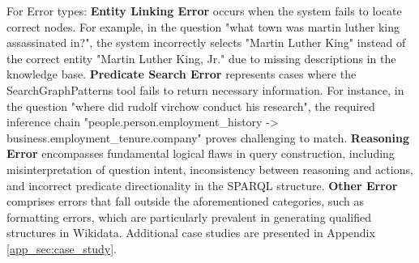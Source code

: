 For Error types:
\textbf{Entity Linking Error} occurs when the system fails to locate correct nodes. For example, in the question "what town was martin luther king assassinated in?", the system incorrectly selects "Martin Luther King" instead of the correct entity "Martin Luther King, Jr." due to missing descriptions in the knowledge base.
\textbf{Predicate Search Error} represents cases where the SearchGraphPatterns tool fails to return necessary information. For instance, in the question "where did rudolf virchow conduct his research", the required inference chain "people.person.employment\_history -> business.employment\_tenure.company" proves challenging to match.
\textbf{Reasoning Error} encompasses fundamental logical flaws in query construction, including misinterpretation of question intent, inconsistency between reasoning and actions, and incorrect predicate directionality in the SPARQL structure.
\textbf{Other Error} comprises errors that fall outside the aforementioned categories, such as formatting errors, which are particularly prevalent in generating qualified structures in Wikidata.
Additional case studies are presented in Appendix \ref{app_sec:case_study}.
